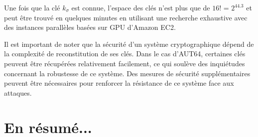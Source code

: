 \documentclass{template}
\begin{document}
Une fois que la clé $k_\sigma$ est connue, l'espace des clés n'est plus que de $16!$ =  $2^{44.3}$ et peut être trouvé en quelques minutes en utilisant une recherche exhaustive avec des instances parallèles basées sur GPU d'Amazon EC2. 

Il est important de noter que la sécurité d'un système cryptographique dépend de la complexité de reconstitution de ses clés. Dans le cas d'AUT64, certaines clés peuvent être récupérées relativement facilement, ce qui soulève des inquiétudes concernant la robustesse de ce système. Des mesures de sécurité supplémentaires peuvent être nécessaires pour renforcer la résistance de ce système face aux attaques.

\section{En résumé...}
\baselineskip=16pt
\end{document}
